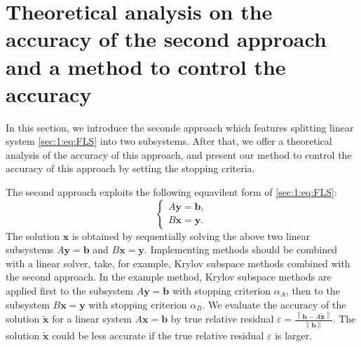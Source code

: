 \section{Theoretical analysis on the accuracy of the second approach and a method to control the accuracy }\label{sec:2}

\par
In this section, we introduce the seconde approach which features splitting linear system \eqref{sec:1:eq:FLS} into two subsystems. After that, we offer a theoretical analysis of the accuracy of this approach, and present our method to control the accuracy of this approach by setting the stopping criteria.
\par
The second approach exploits the following equavilent form of \eqref{sec:1:eq:FLS}:
 \begin{equation}\label{sec:2:eq:SLS}
    \begin{cases}
        A\boldsymbol{y}  =\boldsymbol{b},\\
        B\boldsymbol{x}  =\boldsymbol{y}.
    \end{cases}
\end{equation}
The solution $\boldsymbol{x}$ is obtained by sequentially solving the above two linear subsystems $A\boldsymbol{y}=\boldsymbol{b}$ and $B\boldsymbol{x}=\boldsymbol{y}$. Implementing methods should be combined with a linear solver, take, for example, Krylov subspace methods combined with the second approach. In the example method, Krylov subspace methods are applied first to the subsystem $A\boldsymbol{y}=\boldsymbol{b}$ with stopping criterion $ \alpha_A$, then to the subsystem
$B\boldsymbol{x}=\boldsymbol{y}$ with stopping criterion $ \alpha_B$. We evaluate the accuracy of the solution $\tilde{\boldsymbol{x}}$ for a linear system $A\boldsymbol{x}=\boldsymbol{b}$ by true relative residual $\varepsilon =
\frac{\left\|\boldsymbol{b}-A\tilde{\boldsymbol{x}}\right\|}{\left\|\boldsymbol{b}\right\|}$. The solution $\tilde{\boldsymbol{x}}$ could be less accurate if the true relative residual $ \varepsilon$ is larger. 
